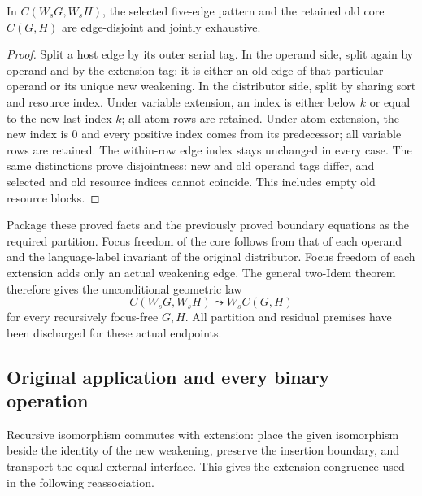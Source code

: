 \begin{lemma}
In $C(W_sG,W_sH)$, the selected five-edge pattern and the retained old core
$C(G,H)$ are edge-disjoint and jointly exhaustive.
\end{lemma}
\begin{proof}
Split a host edge by its outer serial tag. In the operand side, split again
by operand and by the extension tag: it is either an old edge of that
particular operand or its unique new weakening. In the distributor side,
split by sharing sort and resource index. Under variable extension, an
index is either below $k$ or equal to the new last index $k$; all atom rows
are retained. Under atom extension, the new index is $0$ and every positive
index comes from its predecessor; all variable rows are retained. The
within-row edge index stays unchanged in every case. The same distinctions
prove disjointness: new and old operand tags differ, and selected and old
resource indices cannot coincide. This includes empty old resource blocks.
\end{proof}

Package these proved facts and the previously proved boundary equations as
the required partition. Focus freedom of the core follows from that of
each operand and the language-label invariant of the original distributor.
Focus freedom of each extension adds only an actual weakening edge. The
general two-Idem theorem therefore gives the unconditional geometric law
\[
          C(W_sG,W_sH)\leadsto W_s C(G,H)
\]
for every recursively focus-free $G,H$. All partition and residual premises
have been discharged for these actual endpoints.

\subsection{Original application and every binary operation}
Recursive isomorphism commutes with extension: place the given isomorphism
beside the identity of the new weakening, preserve the insertion boundary,
and transport the equal external interface. This gives the extension
congruence used in the following reassociation.

